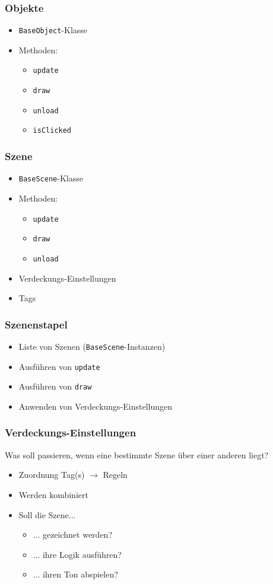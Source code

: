 \begin{frame}
	\frametitle{Objekte}
	\begin{itemize}
		\item \texttt{BaseObject}-Klasse \pause
		\item Methoden:
		\begin{itemize}
			\item \texttt{update}
			\item \texttt{draw}
			\item \texttt{unload}
			\item \texttt{isClicked}
		\end{itemize}
	\end{itemize}
\end{frame}

\begin{frame}
	\frametitle{Szene}
	\begin{itemize}
		\item \texttt{BaseScene}-Klasse \pause
		\item Methoden:
		\begin{itemize}
			\item \texttt{update}
			\item \texttt{draw}
			\item \texttt{unload}
		\end{itemize} \pause
		\item Verdeckungs-Einstellungen \pause
		\item Tags
	\end{itemize}
\end{frame}

\begin{frame}
	\frametitle{Szenenstapel}
	\begin{itemize}
		\item Liste von Szenen (\texttt{BaseScene}-Instanzen) \pause
		\item Ausführen von \texttt{update} \pause
		\item Ausführen von \texttt{draw} \pause
		\item Anwenden von Verdeckungs-Einstellungen
	\end{itemize}
\end{frame}

\begin{frame}
	\frametitle{Verdeckungs-Einstellungen}
	Was soll passieren, wenn eine bestimmte Szene über einer anderen liegt? \pause
	\vspace{0.3cm}
	
	\begin{itemize}
		\item Zuordnung Tag(s) $\rightarrow$ Regeln \pause
		\item Werden kombiniert \pause
		\item Soll die Szene... \pause
		\begin{itemize}
			\item[] ... gezeichnet werden? \pause
			\item[] ... ihre Logik ausführen? \pause
			\item[] ... ihren Ton abspielen?
		\end{itemize}
	\end{itemize}
\end{frame}